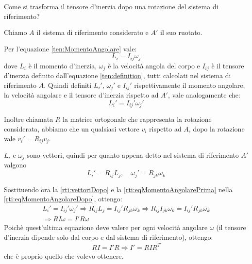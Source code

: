 \documentclass[../main.tex]{subfiles}
\begin{document}

\textex
Come si trasforma il tensore d'inerzia dopo una rotazione del sistema di riferimento?

\solution
Chiamo $A$ il sistema di riferimento considerato e $A'$ il suo ruotato.

Per l'equazione \cref{ten:MomentoAngolare} vale:
\begin{equation} \label{rti:eqMomentoAngolarePrima}
	L_i=I_{ij}\omega_j
\end{equation}
dove $L_i$ è il momento d'inerzia, $\omega_j$ è la velocità angola del corpo e $I_{ij}$ è il tensore d'inerzia definito dall'equazione \cref{ten:definition}, tutti calcolati nel sistema di riferimento $A$. Quindi definiti $L_i'$, $\omega_j'$ e $I_{ij}'$ rispettivamente il momento angolare, la velocità angolare e il tensore d'inerzia rispetto ad $A'$, vale analogamente che:
\begin{equation}\label{rti:eqMomentoAngolareDopo}
	L_i'=I_{ij}'\omega_j'
\end{equation}

Inoltre chiamata $R$ la matrice ortogonale che rappresenta la rotazione considerata, abbiamo che un qualsiasi vettore $v_i$ rispetto ad $A$, dopo la rotazione vale $v_i'=R_{ij}v_j$.

$L_i$ e $\omega_j$ sono vettori, quindi per quanto appena detto nel sistema di riferimento $A'$ valgono
\begin{equation}\label{rti:vettoriDopo}
	L_i'=R_{ij}L_j, \quad \omega_j'=R_{jk}\omega_k
\end{equation}

Sostituendo ora la \cref{rti:vettoriDopo} e la \cref{rti:eqMomentoAngolarePrima} nella \cref{rti:eqMomentoAngolareDopo}, ottengo:
\begin{gather*}
	L_i'=I_{ij}'\omega_j' \Longrightarrow R_{ij}L_j=I_{ij}'R_{jk}\omega_k \Longrightarrow R_{ij}I_{jk}\omega_k=I_{ij}'R_{jk}\omega_k \\
	\Longrightarrow RI\omega=I'R\omega
\end{gather*}
Poichè quest'ultima equazione deve valere per ogni velocità angolare $\omega$ (il tensore d'inerzia dipende solo dal corpo e dal sistema di riferimento), ottengo:
\begin{gather*}
	RI=I'R \Longrightarrow I'=RIR^{T}
\end{gather*}
che è proprio quello che volevo ottenere.
\end{document}
